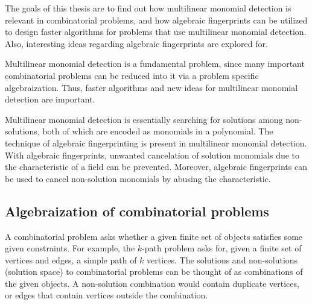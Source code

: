 The goals of this thesis are to find out how multilinear monomial detection is relevant in 
combinatorial problems, and how algebraic fingerprints can be utilized to design faster 
algorithms for problems that use multilinear monomial detection. Also, interesting ideas 
regarding algebraic fingerprints are explored for.

Multilinear monomial detection 
is a fundamental problem, since many important combinatorial problems can be reduced into it 
via a problem specific algebraization. Thus, faster algorithms and new ideas for multilinear monomial detection 
are important.

Multilinear monomial detection is essentially searching for solutions among non-solutions, 
both of which are encoded as monomials in a polynomial. 
The technique of algebraic fingerprinting is present in multilinear monomial detection. 
With algebraic fingerprints, unwanted cancelation of solution monomials due to the characteristic of a field can be prevented. 
Moreover, algebraic fingerprints can be used to cancel non-solution monomials by abusing the characteristic.


\subsection{Algebraization of combinatorial problems}

A combinatorial problem asks whether a given finite set of objects satisfies some given constraints. 
For example, the $k$-path problem asks for, given a finite set of vertices and edges, 
a simple path of $k$ vertices. The solutions and non-solutions (solution space) to combinatorial problems can be thought of as 
combinations of the given objects.
A non-solution combination would contain duplicate vertices, or edges that
contain vertices outside the combination.

